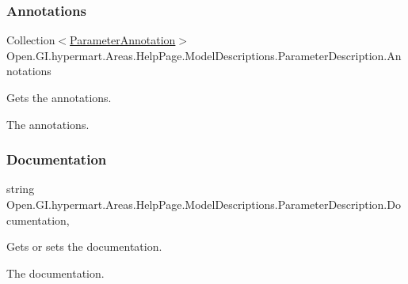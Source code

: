\subsubsection{\texorpdfstring{Annotations}{Annotations}}
{\footnotesize\ttfamily Collection$<$\hyperlink{class_open_1_1_g_i_1_1hypermart_1_1_areas_1_1_help_page_1_1_model_descriptions_1_1_parameter_annotation}{Parameter\+Annotation}$>$ Open.\+G\+I.\+hypermart.\+Areas.\+Help\+Page.\+Model\+Descriptions.\+Parameter\+Description.\+Annotations\hspace{0.3cm}{\ttfamily [get]}}



Gets the annotations. 

The annotations. \hypertarget{class_open_1_1_g_i_1_1hypermart_1_1_areas_1_1_help_page_1_1_model_descriptions_1_1_parameter_description_a14b38b56f23972d23b7fc5594b5ac15f}{}\label{class_open_1_1_g_i_1_1hypermart_1_1_areas_1_1_help_page_1_1_model_descriptions_1_1_parameter_description_a14b38b56f23972d23b7fc5594b5ac15f} 
\subsubsection{\texorpdfstring{Documentation}{Documentation}}
{\footnotesize\ttfamily string Open.\+G\+I.\+hypermart.\+Areas.\+Help\+Page.\+Model\+Descriptions.\+Parameter\+Description.\+Documentation\hspace{0.3cm}{\ttfamily [get]}, {\ttfamily [set]}}



Gets or sets the documentation. 

The documentation. \hypertarget{class_open_1_1_g_i_1_1hypermart_1_1_areas_1_1_help_page_1_1_model_descriptions_1_1_parameter_description_a213cc3debc198eb331e57e38ecdca4ed}{}\label{class_open_1_1_g_i_1_1hypermart_1_1_areas_1_1_help_page_1_1_model_descriptions_1_1_parameter_description_a213cc3debc198eb331e57e38ecdca4ed} 
